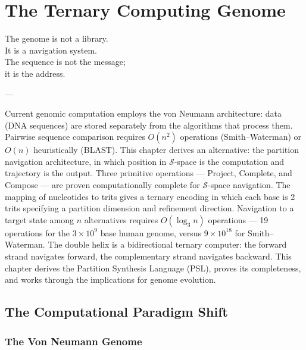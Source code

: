 
\chapter{The Ternary Computing Genome}
\label{chap:ternary_computing}

\epigraph{%
  The genome is not a library.\\
  It is a navigation system.\\
  The sequence is not the message;\\
  it is the address.%
}{---}

\begin{chapterbox}
Current genomic computation employs the von Neumann architecture:
data (DNA sequences) are stored separately from the algorithms that
process them. Pairwise sequence comparison requires $O(n^2)$ operations
(Smith--Waterman) or $O(n)$ heuristically (BLAST). This chapter
derives an alternative: the partition navigation architecture, in which
position in $\mathcal{S}$-space is the computation and trajectory is
the output. Three primitive operations --- Project, Complete, and Compose
--- are proven computationally complete for $\mathcal{S}$-space
navigation. The mapping of nucleotides to trits gives a ternary
encoding in which each base is 2 trits specifying a partition dimension
and refinement direction. Navigation to a target state among $n$ alternatives
requires $O(\log_3 n)$ operations --- 19 operations for the $3\times 10^9$
base human genome, versus $9\times 10^{18}$ for Smith--Waterman.
The double helix is a bidirectional ternary computer: the forward strand
navigates forward, the complementary strand navigates backward. This
chapter derives the Partition Synthesis Language (PSL), proves its
completeness, and works through the implications for genome evolution.
\end{chapterbox}

\section{The Computational Paradigm Shift}
\label{sec:paradigm_shift}

\subsection{The Von Neumann Genome}
\label{ssec:von_neumann}

